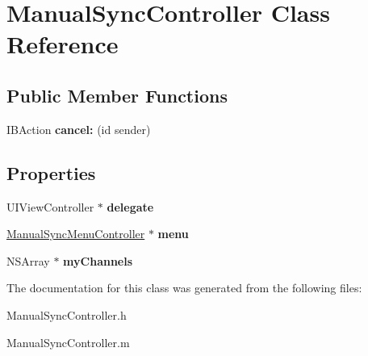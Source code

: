 \hypertarget{interface_manual_sync_controller}{
\section{\-Manual\-Sync\-Controller \-Class \-Reference}
\label{interface_manual_sync_controller}
}
\subsection*{\-Public \-Member \-Functions}
\begin{DoxyCompactItemize}
\item 
\hypertarget{interface_manual_sync_controller_adec0f5c40e9d1ce46e64c51b46b32440}{
\-I\-B\-Action {\bfseries cancel\-:} (id sender)}
\label{interface_manual_sync_controller_adec0f5c40e9d1ce46e64c51b46b32440}

\end{DoxyCompactItemize}
\subsection*{\-Properties}
\begin{DoxyCompactItemize}
\item 
\hypertarget{interface_manual_sync_controller_a09de675d311ba65323b093f799df0fce}{
\-U\-I\-View\-Controller $\ast$ {\bfseries delegate}}
\label{interface_manual_sync_controller_a09de675d311ba65323b093f799df0fce}

\item 
\hypertarget{interface_manual_sync_controller_ad8b3c7d3fc85b97e40a966d4856eb3ff}{
\hyperlink{interface_manual_sync_menu_controller}{\-Manual\-Sync\-Menu\-Controller} $\ast$ {\bfseries menu}}
\label{interface_manual_sync_controller_ad8b3c7d3fc85b97e40a966d4856eb3ff}

\item 
\hypertarget{interface_manual_sync_controller_a50520e0356c02c3a9bc8613aa6ddd22c}{
\-N\-S\-Array $\ast$ {\bfseries my\-Channels}}
\label{interface_manual_sync_controller_a50520e0356c02c3a9bc8613aa6ddd22c}

\end{DoxyCompactItemize}


\-The documentation for this class was generated from the following files\-:\begin{DoxyCompactItemize}
\item 
\-Manual\-Sync\-Controller.\-h\item 
\-Manual\-Sync\-Controller.\-m\end{DoxyCompactItemize}
